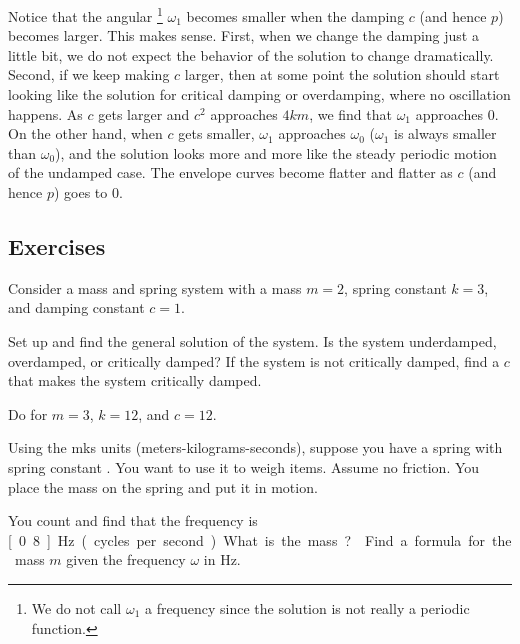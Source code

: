 Notice that the angular
\emph{}\footnote{We do not call $\omega_1$ a frequency
since the solution is not really a periodic function.} $\omega_1$ becomes
smaller when the damping $c$ (and hence $p$) becomes larger.
This makes sense.
First, when we change the damping just a little bit, we do not
expect the behavior of the solution to change dramatically.
Second, if we keep making $c$ larger, then
at some point the solution should start looking 
like the solution for critical damping or overdamping, where no oscillation
happens.
As $c$ gets larger and $c^2$ approaches $4km$,
we find that $\omega_1$ approaches $0$.
%
On the other hand, when $c$ gets smaller, $\omega_1$ approaches $\omega_0$
($\omega_1$ is always smaller than $\omega_0$), and the solution looks more and more like the steady
periodic motion of the undamped case.  The envelope curves become flatter and
flatter as $c$ (and hence $p$) goes to $0$.

\subsection{Exercises}

\begin{samepage}
\begin{exercise} \label{mv:ex1}
Consider a mass and spring system with a mass $m=2$, spring constant $k=3$, and
damping constant $c=1$.
\begin{tasks}
\task Set up and find the general solution of the system.
\task Is the system underdamped, overdamped, or critically damped?
\task If the system is not critically damped, find a $c$ that makes the system
critically damped.
\end{tasks}
\end{exercise}
\end{samepage}

\begin{exercise}
Do  for
$m=3$, $k=12$, and $c=12$.
\end{exercise}

\begin{exercise} \label{mv:exwt1}
Using the mks units (meters-kilograms-seconds),
suppose you have a spring with spring constant .
You want to use
it to weigh items.  Assume no friction.  You place the mass on
the spring and put it in motion.
\begin{tasks}
\task You count and find that the frequency is
\unit[0.8]{Hz} (cycles per second).  What is the mass?
\task Find a formula for the mass $m$
given the frequency $\omega$ in \unit{Hz}.
\end{tasks}
\end{exercise}


